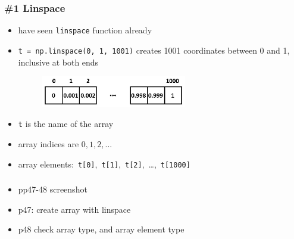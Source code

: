 \documentclass[14pt]{beamer}
\begin{document}
\begin{frame}[fragile]

\frametitle{\#1 Linspace}

\begin{itemize}
	\item have seen \texttt{linspace} function already
	\item \texttt{t = np.linspace(0, 1, 1001)} creates 1001 coordinates between 0 and 1, inclusive at both ends
	
	\begin{figure}[ht]
		\centering
		\includegraphics[width=0.6\textwidth]{figures/arrayElementsMilliseconds}
	\end{figure}

	\item \texttt{t} is the name of the array
	\item array indices are $0, 1, 2, \ldots$
	\item array elements:~\texttt{t[0]},~\texttt{t[1]},~\texttt{t[2]},~\ldots,~\texttt{t[1000]}
\end{itemize}

\end{frame}


\begin{frame}[fragile]

\frametitle{}

\begin{itemize}
	\item pp47-48 screenshot
	\item p47: create array with linspace
	\item p48 check array type, and array element type
\end{itemize}

\end{frame}

\end{document}
